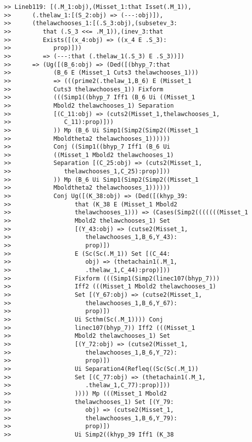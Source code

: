 \documentclass[12pt]{article}
\begin{document}
\begin{verbatim}
>> Lineb119: [(.M_1:obj),(Misset_1:that Isset(.M_1)),
>>      (.thelaw_1:[(S_2:obj) => (---:obj)]),
>>      (thelawchooses_1:[(.S_3:obj),(subsetev_3:
>>         that (.S_3 <<= .M_1)),(inev_3:that
>>         Exists([(x_4:obj) => ((x_4 E .S_3):
>>            prop)]))
>>         => (---:that (.thelaw_1(.S_3) E .S_3))])
>>      => (Ug([(B_6:obj) => (Ded([(bhyp_7:that
>>            (B_6 E (Misset_1 Cuts3 thelawchooses_1)))
>>            => (((prime2(.thelaw_1,B_6) E (Misset_1
>>            Cuts3 thelawchooses_1)) Fixform
>>            (((Simp1((bhyp_7 Iff1 (B_6 Ui ((Misset_1
>>            Mbold2 thelawchooses_1) Separation
>>            [(C_11:obj) => (cuts2(Misset_1,thelawchooses_1,
>>               C_11):prop)]))
>>            )) Mp (B_6 Ui Simp1(Simp2(Simp2((Misset_1
>>            Mboldtheta2 thelawchooses_1))))))
>>            Conj ((Simp1((bhyp_7 Iff1 (B_6 Ui
>>            ((Misset_1 Mbold2 thelawchooses_1)
>>            Separation [(C_25:obj) => (cuts2(Misset_1,
>>               thelawchooses_1,C_25):prop)]))
>>            )) Mp (B_6 Ui Simp1(Simp2(Simp2((Misset_1
>>            Mboldtheta2 thelawchooses_1))))))
>>            Conj Ug([(K_38:obj) => (Ded([(khyp_39:
>>                  that (K_38 E (Misset_1 Mbold2
>>                  thelawchooses_1))) => (Cases(Simp2(((((((Misset_1
>>                  Mbold2 thelawchooses_1) Set
>>                  [(Y_43:obj) => (cutse2(Misset_1,
>>                     thelawchooses_1,B_6,Y_43):
>>                     prop)])
>>                  E (Sc(Sc(.M_1)) Set [(C_44:
>>                     obj) => (thetachain1(.M_1,
>>                     .thelaw_1,C_44):prop)]))
>>                  Fixform (((Simp1(Simp2(linec107(bhyp_7)))
>>                  Iff2 (((Misset_1 Mbold2 thelawchooses_1)
>>                  Set [(Y_67:obj) => (cutse2(Misset_1,
>>                     thelawchooses_1,B_6,Y_67):
>>                     prop)])
>>                  Ui Scthm(Sc(.M_1)))) Conj
>>                  linec107(bhyp_7)) Iff2 (((Misset_1
>>                  Mbold2 thelawchooses_1) Set
>>                  [(Y_72:obj) => (cutse2(Misset_1,
>>                     thelawchooses_1,B_6,Y_72):
>>                     prop)])
>>                  Ui Separation4(Refleq((Sc(Sc(.M_1))
>>                  Set [(C_77:obj) => (thetachain1(.M_1,
>>                     .thelaw_1,C_77):prop)]))
>>                  )))) Mp (((Misset_1 Mbold2
>>                  thelawchooses_1) Set [(Y_79:
>>                     obj) => (cutse2(Misset_1,
>>                     thelawchooses_1,B_6,Y_79):
>>                     prop)])
>>                  Ui Simp2((khyp_39 Iff1 (K_38

\end{verbatim}
\end{document}
